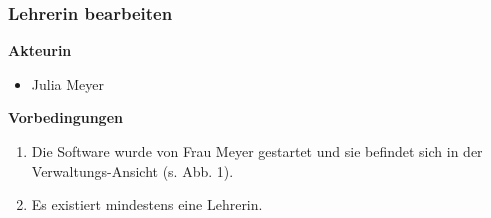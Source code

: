 \documentclass[fontsize=12pt,paper=a4,twoside]{scrartcl}
\begin{document}
\subsubsection{Lehrerin bearbeiten}
\label{subsubsec:LehrerinBearbeiten}
\textbf{Akteurin}
\begin{itemize}
\item Julia Meyer
\end{itemize}
\vspace{5pt}


\textbf{Vorbedingungen}
\begin{enumerate}
\item Die Software wurde von Frau Meyer gestartet und sie befindet sich in der Verwaltungs-Ansicht (s. Abb. 1).
\item Es existiert mindestens eine Lehrerin.
\end{enumerate}
\vspace{5pt}
\end{document}
